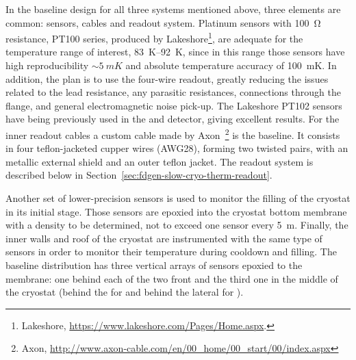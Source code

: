 In the baseline design for all three systems mentioned above, three elements are common: sensors, cables and readout system.
Platinum sensors with \SI{100}{\ohm} resistance, PT100 series, produced by Lakeshore\footnote{Lakeshore\texttrademark{}, \url{https://www.lakeshore.com/Pages/Home.aspx}.},
are adequate for the temperature range of interest, \SIrange{83}{92}{K}, since in this range those sensors have high reproducibility 
$\sim\SI{5}{mK}$ and absolute temperature accuracy of \SI{100}{mK}.
In addition, the plan is to use the four-wire readout, greatly reducing the issues related to the lead resistance, any parasitic resistances,
connections through the flange, and general electromagnetic noise pick-up. The Lakeshore PT102 sensors
have being previously used in the  and  detector,
giving excellent results. For the inner readout cables a custom cable made by Axon~\footnote{Axon\texttrademark{}, \url{http://www.axon-cable.com/en/00_home/00_start/00/index.aspx}} is the baseline. It consists in four teflon-jacketed 
cupper wires (AWG28), forming two twisted pairs, with an metallic external shield
and an outer teflon jacket.
The readout system is described below in  Section~\ref{sec:fdgen-slow-cryo-therm-readout}. %



Another set of lower-precision sensors is used to monitor the filling of the cryostat in its initial stage. Those sensors are epoxied into the cryostat bottom membrane with
a density to be determined, not to exceed one sensor every \SI{5}{m}. 
Finally, the inner walls and roof of the cryostat are instrumented with the same type of sensors in order to monitor their temperature during cooldown and filling.
The baseline distribution has three vertical arrays of sensors epoxied to the membrane: one behind each of the two %
front  and the third one in the middle of the cryostat
(behind the  for \single and behind the lateral %
 for \dual). 

